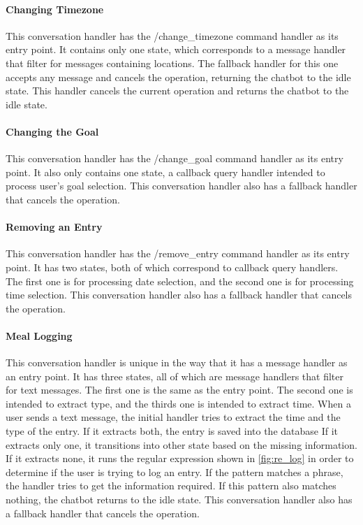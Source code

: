 \paragraph{Changing Timezone} This conversation handler has the /change\_timezone command handler as its entry point.
It contains only one state, which corresponds to a message handler that filter for messages containing locations.
The fallback handler for this one accepts any message and cancels the operation, returning the chatbot to the idle state.
This handler cancels the current operation and returns the chatbot to the idle state.

\paragraph{Changing the Goal} This conversation handler has the /change\_goal command handler as its entry point.
It also only contains one state, a callback query handler intended to process user's goal selection.
This conversation handler also has a fallback handler that cancels the operation.

\paragraph{Removing an Entry} This conversation handler has the /remove\_entry command handler as its entry point.
It has two states, both of which correspond to callback query handlers.
The first one is for processing date selection, and the second one is for processing time selection.
This conversation handler also has a fallback handler that cancels the operation.

\paragraph{Meal Logging} This conversation handler is unique in the way that it has a message handler as an entry point.
It has three states, all of which are message handlers that filter for text messages.
The first one is the same as the entry point.
The second one is intended to extract type, and the thirds one is intended to extract time.
When a user sends a text message, the initial handler tries to extract the time and the type of the entry.
If it extracts both, the entry is saved into the database
If it extracts only one, it transitions into other state based on the missing information.
If it extracts none, it runs the regular expression shown in \autoref{fig:re_log} in order to determine if the user is trying to log an entry.
If the pattern matches a phrase, the handler tries to get the information required.
If this pattern also matches nothing, the chatbot returns to the idle state.
This conversation handler also has a fallback handler that cancels the operation.


